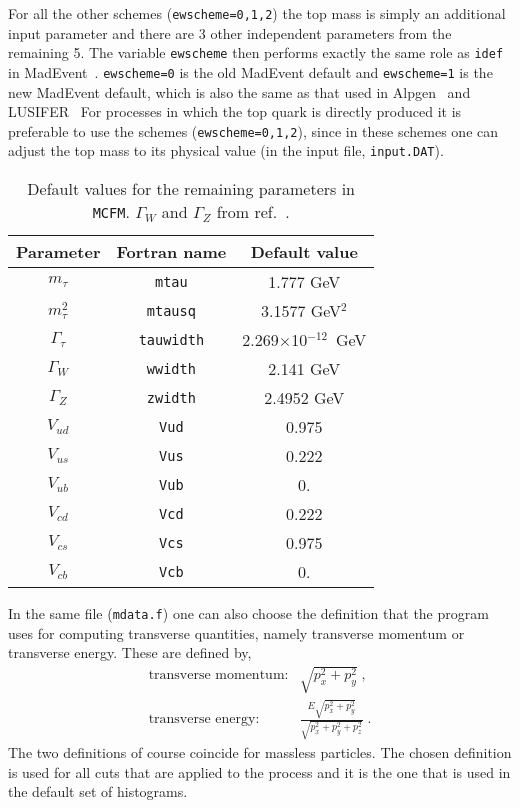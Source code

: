 \documentclass[12pt]{article}
\begin{document}
For all the other schemes ({\tt ewscheme=0,1,2}) the top mass is simply
an additional input parameter and there are 3 other independent
parameters from the remaining 5. The variable {\tt ewscheme} then performs
exactly the same role as {\tt idef} in MadEvent~\cite{Maltoni:2002qb}.
{\tt ewscheme=0} is the old MadEvent default and {\tt ewscheme=1} is the
new MadEvent default, which is also the same as that used in 
Alpgen~\cite{Alpgen} and LUSIFER~\cite{Lusifer} 
For processes in which the top quark is directly produced  it is 
preferable to use  the schemes ({\tt ewscheme=0,1,2}), since in these schemes
one can adjust the top mass to its physical value (in the input file,
{\tt input.DAT}).

\begin{table}
\begin{center}
\begin{tabular}{|c|c|c|} \hline
Parameter & Fortran name & Default value \\ 
\hline
$m_\tau$         & {\tt mtau}      & 1.777 GeV            \\
$m^2_\tau$& {\tt mtausq}  & 3.1577 GeV$^2$     \\
$\Gamma_\tau$    & {\tt tauwidth}& 2.269$\times$10$^{-12}$~GeV \\
$\Gamma_W$       & {\tt wwidth}  & 2.141 GeV               \\
$\Gamma_Z$       & {\tt zwidth}  & 2.4952 GeV               \\
$V_{ud}$         & {\tt Vud}     & 0.975                  \\
$V_{us}$         & {\tt Vus}     & 0.222             \\
$V_{ub}$         & {\tt Vub}     & 0.                     \\
$V_{cd}$         & {\tt Vcd}     & 0.222             \\
$V_{cs}$         & {\tt Vcs}     & 0.975                  \\
$V_{cb}$         & {\tt Vcb}     & 0.                     \\
\hline
\end{tabular}
\caption{Default values for the remaining parameters in {\tt MCFM}.
$\Gamma_W$ and $\Gamma_Z$ from ref.~\cite{Amsler:2008zzb}.}
\label{default} 
\end{center}
\end{table}

In the same file ({\tt mdata.f}) one can also choose the definition
that the program uses for computing transverse quantities, namely
transverse momentum or transverse energy. These are defined by,
\begin{eqnarray}
\mbox{transverse momentum:} & \sqrt{p_x^2+p_y^2} \; ,\nonumber \\
\mbox{transverse energy:}   &
 \frac{E \sqrt{p_x^2+p_y^2}}{\sqrt{p_x^2+p_y^2+p_z^2}} \; .
\end{eqnarray}
The two definitions of course coincide for massless particles.
The chosen definition is used for all cuts that are applied to the
process and it is the one that is used in the default set of histograms.
\end{document}
